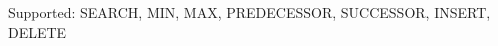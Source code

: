 \documentclass[preview]{standalone}
\begin{document}
Supported: SEARCH, MIN, MAX, PREDECESSOR, SUCCESSOR, INSERT, DELETE\\
\end{document}
